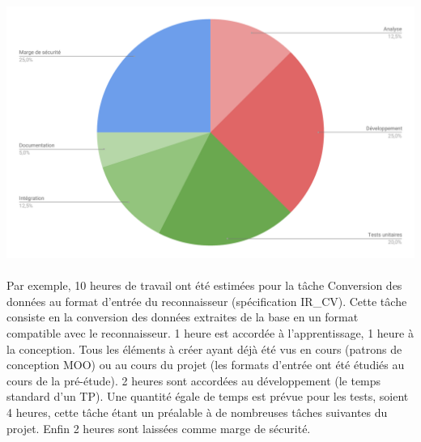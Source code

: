 \newpage

\begin{mdframed}[frametitle={Figure 1 : Diagramme de répartition du travail par tâche}, innerbottommargin=10]
\begin{center}
\includegraphics[scale=0.44]{repartition_travail_taches.pdf}
\end{center}
\end{mdframed}

\paragraph{}

\paragraph{}

Par exemple, 10 heures de travail ont été estimées pour la tâche Conversion des données au format d’entrée du reconnaisseur (spécification IR\_CV). Cette tâche consiste en la conversion des données extraites de la base en un format compatible avec le reconnaisseur. 1 heure est accordée à l’apprentissage, 1 heure à la conception. Tous les éléments à créer ayant déjà été vus en cours (patrons de conception MOO) ou au cours du projet (les formats d’entrée ont été étudiés au cours de la pré-étude). 2 heures sont accordées au développement (le temps standard d’un TP). Une quantité égale de temps est prévue pour les tests, soient 4 heures, cette tâche étant un préalable à de nombreuses tâches suivantes du projet. Enfin 2 heures sont laissées comme marge de sécurité.


